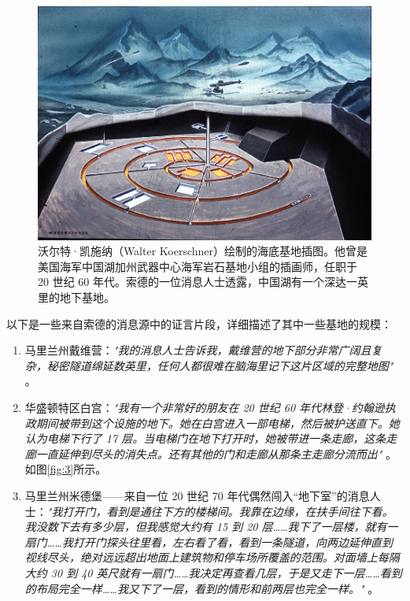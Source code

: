 \documentclass[10pt,twocolumn,letterpaper]{article}
\begin{document}
\begin{figure}[t]
\begin{center}
   \includegraphics[width=1\linewidth]{undersea.jpg}
\end{center}
   \caption{沃尔特·凯施纳（Walter Koerschner）绘制的海底基地插图。他曾是美国海军中国湖加州武器中心海军岩石基地小组的插画师，任职于 20 世纪 60 年代。索德的一位消息人士透露，中国湖有一个深达一英里的地下基地\cite{22,23}。}
\label{fig:5}
\label{fig:onecol}
\end{figure}

以下是一些来自索德的消息源中的证言片段，详细描述了其中一些基地的规模：

\begin{flushleft}
\begin{enumerate}
    \item 马里兰州戴维营：\textit{"我的消息人士告诉我，戴维营的地下部分非常广阔且复杂，秘密隧道绵延数英里，任何人都很难在脑海里记下这片区域的完整地图"} \cite{22}。
    \item 华盛顿特区白宫：\textit{"我有一个非常好的朋友在 20 世纪 60 年代林登·约翰逊执政期间被带到这个设施的地下。她在白宫进入一部电梯，然后被护送直下。她认为电梯下行了 17 层。当电梯门在地下打开时，她被带进一条走廊，这条走廊一直延伸到尽头的消失点。还有其他的门和走廊从那条主走廊分流而出"} \cite{22}。如图\ref{fig:3}所示。
    \item 马里兰州米德堡——来自一位 20 世纪 70 年代偶然闯入“地下室”的消息人士：\textit{"我打开门，看到是通往下方的楼梯间。我靠在边缘，在扶手间往下看。我没数下去有多少层，但我感觉大约有 15 到 20 层……我下了一层楼，就有一扇门……我打开门探头往里看，左右看了看，看到一条隧道，向两边延伸直到视线尽头，绝对远远超出地面上建筑物和停车场所覆盖的范围。对面墙上每隔大约 30 到 40 英尺就有一扇门……我决定再查看几层，于是又走下一层……看到的布局完全一样……我又下了一层，看到的情形和前两层也完全一样。"} \cite{22}。
\end{enumerate}
\end{flushleft}
\end{document}

